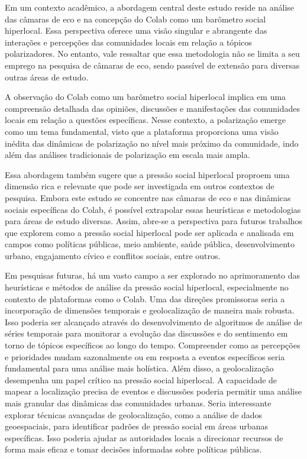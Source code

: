 Em um contexto acadêmico, a abordagem central deste estudo reside na análise das câmaras de eco e na concepção do Colab como um barômetro social hiperlocal. Essa perspectiva oferece uma visão singular e abrangente das interações e percepções das comunidades locais em relação a tópicos polarizadores. No entanto, vale ressaltar que essa metodologia não se limita a seu emprego na pesquisa de câmaras de eco, sendo passível de extensão para diversas outras áreas de estudo.

A observação do Colab como um barômetro social hiperlocal implica em uma compreensão detalhada das opiniões, discussões e manifestações das comunidades locais em relação a questões específicas. Nesse contexto, a polarização emerge como um tema fundamental, visto que a plataforma proporciona uma visão inédita das dinâmicas de polarização no nível mais próximo da comunidade, indo além das análises tradicionais de polarização em escala mais ampla.

Essa abordagem também sugere que a pressão social hiperlocal proproem uma dimensão rica e relevante que pode ser investigada em outros contextos de pesquisa. Embora este estudo se concentre nas câmaras de eco e nas dinâmicas sociais específicas do Colab, é possível extrapolar essas heurísticas e metodologias para áreas de estudo diversas. Assim, abre-se a perspectiva para futuros trabalhos que explorem como a pressão social hiperlocal pode ser aplicada e analisada em campos como políticas públicas, meio ambiente, saúde pública, desenvolvimento urbano, engajamento cívico e conflitos sociais, entre outros.

Em pesquisas futuras, há um vasto campo a ser explorado no aprimoramento das heurísticas e métodos de análise da pressão social hiperlocal, especialmente no contexto de plataformas como o Colab. Uma das direções promissoras seria a incorporação de dimensões temporais e geolocalização de maneira mais robusta. Isso poderia ser alcançado através do desenvolvimento de algoritmos de análise de séries temporais para monitorar a evolução das discussões e do sentimento em torno de tópicos específicos ao longo do tempo. Compreender como as percepções e prioridades mudam sazonalmente ou em resposta a eventos específicos seria fundamental para uma análise mais holística. Além disso, a geolocalização desempenha um papel crítico na pressão social hiperlocal. A capacidade de mapear a localização precisa de eventos e discussões poderia permitir uma análise mais granular das dinâmicas das comunidades urbanas. Seria interessante explorar técnicas avançadas de geolocalização, como a análise de dados geoespaciais, para identificar padrões de pressão social em áreas urbanas específicas. Isso poderia ajudar as autoridades locais a direcionar recursos de forma mais eficaz e tomar decisões informadas sobre políticas públicas.

